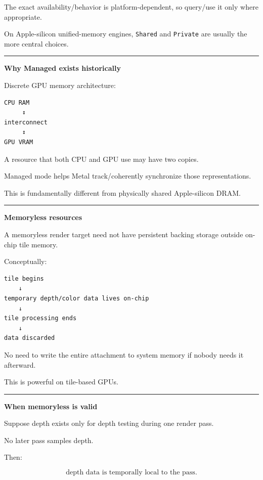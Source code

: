 The exact availability/behavior is platform-dependent, so query/use it only where appropriate.

On Apple-silicon unified-memory engines, \texttt{Shared} and \texttt{Private} are usually the more central choices.

\begin{center}\rule{0.5\linewidth}{0.5pt}\end{center}

\textbf{Why Managed exists historically}

Discrete GPU memory architecture:

\begin{verbatim}
CPU RAM
     ↕
interconnect
     ↕
GPU VRAM
\end{verbatim}

A resource that both CPU and GPU use may have two copies.

Managed mode helps Metal track/coherently synchronize those representations.

This is fundamentally different from physically shared Apple-silicon DRAM.

\begin{center}\rule{0.5\linewidth}{0.5pt}\end{center}

\textbf{Memoryless resources}

A memoryless render target need not have persistent backing storage outside on-chip tile memory.

Conceptually:

\begin{verbatim}
tile begins
    ↓
temporary depth/color data lives on-chip
    ↓
tile processing ends
    ↓
data discarded
\end{verbatim}

No need to write the entire attachment to system memory if nobody needs it afterward.

This is powerful on tile-based GPUs.

\begin{center}\rule{0.5\linewidth}{0.5pt}\end{center}

\textbf{When memoryless is valid}

Suppose depth exists only for depth testing during one render pass.

No later pass samples depth.

Then:

\[
\boxed{
\text{depth data is temporally local to the pass}.
}
\]

